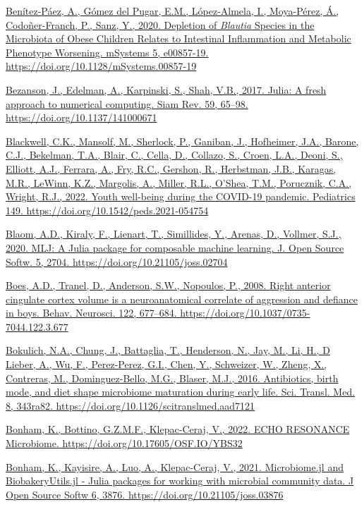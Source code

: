 \documentclass[
]{article}
\begin{document}
\href{https://www.zotero.org/google-docs/?uydJ8e}{Benítez-Páez, A.,
Gómez del Pugar, E.M., López-Almela, I., Moya-Pérez, Á., Codoñer-Franch,
P., Sanz, Y., 2020. Depletion of \emph{Blautia} Species in the
Microbiota of Obese Children Relates to Intestinal Inflammation and
Metabolic Phenotype Worsening. mSystems 5, e00857-19.
https://doi.org/10.1128/mSystems.00857-19}

\href{https://www.zotero.org/google-docs/?uydJ8e}{Bezanson, J., Edelman,
A., Karpinski, S., Shah, V.B., 2017. Julia: A fresh approach to
numerical computing. Siam Rev. 59, 65--98.
https://doi.org/10.1137/141000671}

\href{https://www.zotero.org/google-docs/?uydJ8e}{Blackwell, C.K.,
Mansolf, M., Sherlock, P., Ganiban, J., Hofheimer, J.A., Barone, C.J.,
Bekelman, T.A., Blair, C., Cella, D., Collazo, S., Croen, L.A., Deoni,
S., Elliott, A.J., Ferrara, A., Fry, R.C., Gershon, R., Herbstman, J.B.,
Karagas, M.R., LeWinn, K.Z., Margolis, A., Miller, R.L., O'Shea, T.M.,
Porucznik, C.A., Wright, R.J., 2022. Youth well-being during the
COVID-19 pandemic. Pediatrics 149.
https://doi.org/10.1542/peds.2021-054754}

\href{https://www.zotero.org/google-docs/?uydJ8e}{Blaom, A.D., Kiraly,
F., Lienart, T., Simillides, Y., Arenas, D., Vollmer, S.J., 2020. MLJ: A
Julia package for composable machine learning. J. Open Source Softw. 5,
2704. https://doi.org/10.21105/joss.02704}

\href{https://www.zotero.org/google-docs/?uydJ8e}{Boes, A.D., Tranel,
D., Anderson, S.W., Nopoulos, P., 2008. Right anterior cingulate cortex
volume is a neuroanatomical correlate of aggression and defiance in
boys. Behav. Neurosci. 122, 677--684.
https://doi.org/10.1037/0735-7044.122.3.677}

\href{https://www.zotero.org/google-docs/?uydJ8e}{Bokulich, N.A., Chung,
J., Battaglia, T., Henderson, N., Jay, M., Li, H., D Lieber, A., Wu, F.,
Perez-Perez, G.I., Chen, Y., Schweizer, W., Zheng, X., Contreras, M.,
Dominguez-Bello, M.G., Blaser, M.J., 2016. Antibiotics, birth mode, and
diet shape microbiome maturation during early life. Sci. Transl. Med. 8,
343ra82. https://doi.org/10.1126/scitranslmed.aad7121}

\href{https://www.zotero.org/google-docs/?uydJ8e}{Bonham, K., Bottino,
G.Z.M.F., Klepac-Ceraj, V., 2022. ECHO RESONANCE Microbiome.
https://doi.org/10.17605/OSF.IO/YBS32}

\href{https://www.zotero.org/google-docs/?uydJ8e}{Bonham, K., Kayisire,
A., Luo, A., Klepac-Ceraj, V., 2021. Microbiome.jl and BiobakeryUtils.jl
- Julia packages for working with microbial community data. J Open
Source Softw 6, 3876. https://doi.org/10.21105/joss.03876}
\end{document}
